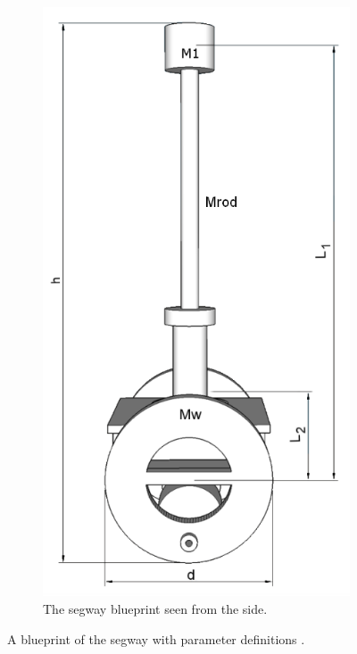 \begin{figure}[H]
\begin{subfigure}[b]{0.25\textwidth}
	\includegraphics[width=\textwidth]{figures/segwayModelSide.png}
	\caption{The segway blueprint seen from the side.}
	\label{fig:segwaySide}
	\end{subfigure}
	\caption{A blueprint of the segway with parameter definitions \citep[p.~74]{DARSAS}.}
	\label{segwaySchematic}
\end{figure}



